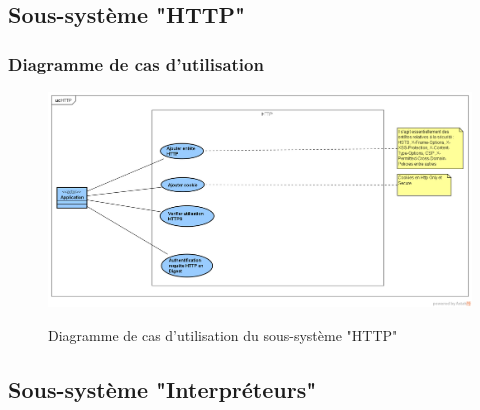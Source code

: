 \subsection{Sous-système "HTTP"}
\subsubsection{Diagramme de cas d'utilisation}
\begin{figure}[H]
	\centering
	\begin{minipage}{12cm}
		\centering
		{\includegraphics[height=0.35\textheight, width=1\textwidth]{fig/HTTP-use-case-diagram.png}}
	\end{minipage}
	\caption{Diagramme de cas d'utilisation du sous-système "HTTP"}
	\label{fig:7.17}
\end{figure}

\subsection{Sous-système "Interpréteurs"}
